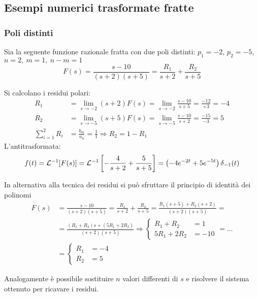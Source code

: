 
\subsection{Esempi numerici trasformate fratte}
\subsubsection{Poli distinti}
Sia la seguente funzione razionale fratta con due poli distinti: $p_1 = -2$,
$p_2=-5$, $n=2,\ m=1,\ n-m=1$
$$
F(s) = \frac{s-10}{(s+2)(s+5)} = \frac{R_1}{s+2} + \frac{R_2}{s+5}
$$

Si calcolano i residui polari:
$$\begin{aligned}
R_1 &= \lim_{s\to -2} (s+2)F(s) = \lim_{s\to -2} \frac{s-10}{s+5} =
\frac{-12}{+3} = -4\\
R_2 &= \lim_{s\to -5} (s+5)F(s) = \lim_{s\to -5}
\frac{s-10}{s+2} = \frac{-15}{-3} = 5\\
\sum_{i=1}^2R_i &= \frac{b_m}{a_n} = \frac{1}{1} \Rightarrow R_2 = 1-R_1
\end{aligned}
$$
L'antitrasformata:
$$
f(t) = \mathcal{L}^{-1}[F(s)] = \mathcal{L}^{-1}\left[-\frac{4}{s+2}+\frac{5}{s+5}\right] =
\left(-4e^{-2t} + 5e^{-5t}\right)\delta_{-1}(t)
$$

In alternativa alla tecnica dei residui si può sfruttare il principio di
identità dei polinomi
$$\begin{aligned}
F(s) &= \frac{s-10}{(s+2)(s+5)} = \frac{R_1}{s+2} + \frac{R_2}{s+5} =
\frac{R_1(s+5)+R_2(s+2)}{(s+2)(s+5)} =\\
&=\frac{(R_1+R_2)s+(5R_1+2R_2)}{(s+2)(s+5)} \Rightarrow \left\{
\begin{aligned}
R_1+R_2 &=1\\
5R_1+2R_2 &= -10
\end{aligned}\right. = \ldots \\&=
\left\{\begin{aligned}
R_1 &= -4 \\ R_2 &= 5
\end{aligned}\right.
\end{aligned}$$

Analogamente è possibile sostituire $n$ valori differenti di $s$ e risolvere il
sistema ottenuto per ricavare i residui.

\newpage
